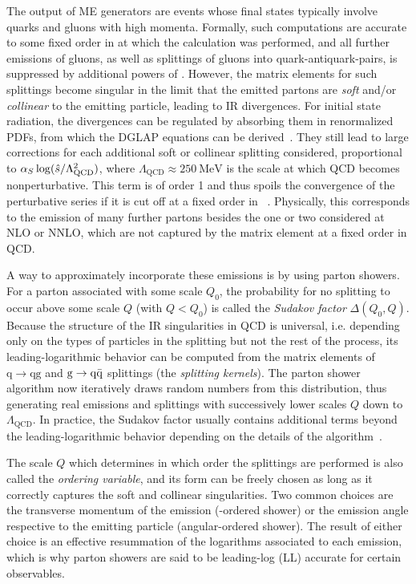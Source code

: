 The output of ME generators are events whose final states typically involve quarks and gluons with high momenta. Formally, such computations are accurate to some fixed order in \alphas at which the calculation was performed, and all further emissions of gluons, as well as splittings of gluons into quark-antiquark-pairs, is suppressed by additional powers of \alphas. 
However, the matrix elements for such splittings become singular in the limit that the emitted partons are \textit{soft} and/or \textit{collinear} to the emitting particle, leading to IR divergences. For initial state radiation, the divergences can be regulated by absorbing them in renormalized PDFs, from which the DGLAP equations can be derived~\cite{Skands:2012ts,Schwartz:2014sze}. They still lead to large corrections for each additional soft or collinear splitting considered, 
proportional to $\alpha_S \log( \hat{s} / \Lambda_{\mathrm{QCD}}^2)$, where $\Lambda_{\mathrm{QCD}} \approx \SI{250}{\MeV}$ is the scale at which QCD becomes nonperturbative. This term is of order 1 and thus spoils the convergence of the perturbative series if it is cut off at a fixed order in \alphas~\cite{Peskin:1995ev,Skands:2012ts}.
Physically, this corresponds to the emission of many further partons besides the one or two considered at NLO or NNLO, which are not captured by the matrix element at a fixed order in QCD.

A way to approximately incorporate these emissions is by using parton showers. %
For a parton associated with some scale $Q_0$, the probability for no splitting to occur above some scale $Q$ (with $Q < Q_0$) is called the \textit{Sudakov factor} $\Delta(Q_0,Q)$. Because the structure of the IR singularities in QCD is universal, i.e. depending only on the types of particles in the splitting but not the rest of the process, its leading-logarithmic behavior can be computed from the matrix elements of $\mathrm{q \rightarrow qg}$ and $\mathrm{g \rightarrow \mathrm{q \bar{q}}}$ splittings (the \textit{splitting kernels}).
The parton shower algorithm now iteratively draws random numbers from this distribution, thus generating real emissions and splittings with successively lower scales $Q$ down to $\Lambda_{\mathrm{QCD}}$. In practice, the Sudakov factor usually contains additional terms beyond the leading-logarithmic behavior depending on the details of the algorithm~\cite{Skands:2012ts}.

The scale $Q$ which determines in which order the splittings are performed is also called the \textit{ordering variable}, and its form can be freely chosen as long as it correctly captures the soft and collinear singularities. Two common choices are the transverse momentum of the emission (\pt-ordered shower) or the emission angle respective to the emitting particle (angular-ordered shower). The result of either choice is an effective resummation of the logarithms associated to each emission, which is why parton showers are said to be leading-log (LL) accurate for certain observables.

